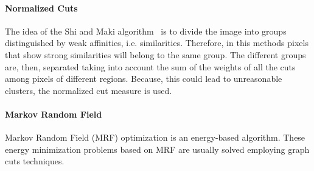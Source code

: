 \paragraph*{Normalized Cuts}

The idea of the Shi and Maki algorithm~\cite{shi2000normalized} is to divide the image into groups distinguished by weak affinities, i.e. similarities. 
Therefore, in this methods pixels that show strong similarities will belong to the same group. 
The different groups are, then, separated taking into account the sum of the weights of all the cuts among pixels of different regions.
Because, this could lead to unreasonable clusters, the normalized cut measure is used.


\paragraph*{Markov Random Field}

Markov Random Field (MRF) optimization is an energy-based algorithm.
These energy minimization problems based on MRF are usually solved employing graph cuts techniques.
















